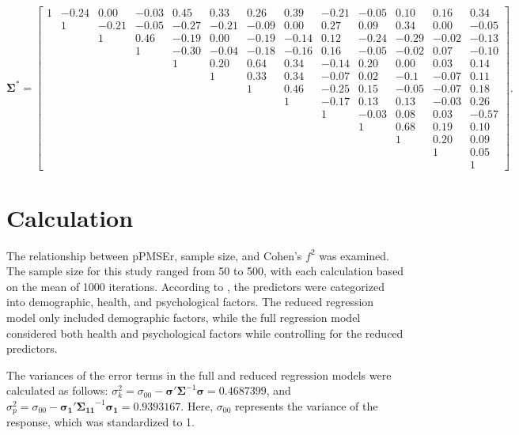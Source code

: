  \scriptsize{
\begin{equation}\label{eq:Sigma}
\bm{\Sigma}^* =
\left[\begin{array}{ccccccccccccc}
  1&   -0.24& 0.00 &-0.03& 0.45 &0.33 &0.26& 0.39 &-0.21& -0.05& 0.10& 0.16 &0.34\\
  &1 &-0.21& -0.05 &-0.27 &-0.21& -0.09& 0.00 &0.27& 0.09 &0.34& 0.00 &-0.05 \\
  & & 1&0.46& -0.19& 0.00& -0.19 &-0.14 &0.12& -0.24 &-0.29& -0.02& -0.13\\
  & & & 1&-0.30& -0.04 &-0.18& -0.16& 0.16 &-0.05& -0.02& 0.07& -0.10 \\
  & & & & 1&0.20& 0.64 &0.34 &-0.14& 0.20& 0.00 &0.03& 0.14 \\
  & & & & & 1&0.33 &0.34& -0.07 &0.02& -0.1& -0.07& 0.11\\
  & & & & & & 1& 0.46& -0.25 &0.15& -0.05 &-0.07 &0.18\\
  & & & & & & & 1&-0.17& 0.13& 0.13 &-0.03& 0.26\\
  & & & & & & & & 1& -0.03 &0.08 &0.03 &-0.57\\
  & & & & & & & & & 1&0.68 &0.19& 0.10\\
  & & & & & & & & & & 1&0.20 &0.09\\
  & & & & & & & & & & & 1& 0.05\\
 & & & & & & & & & & & &1
 \end{array}\right].
 \end{equation}
 }
 \normalsize


\section{Calculation}

The relationship between pPMSEr, sample size, and Cohen's $f^2$ was examined. The sample size for this study ranged from 50 to 500, with each calculation based on the mean of 1000 iterations. According to \cite{baker2008chronicpain}, the predictors were categorized into demographic, health, and psychological factors. The reduced regression model only included demographic factors, while the full regression model considered both health and psychological factors while controlling for the reduced predictors.
  
 The variances of the error terms in the full and reduced regression models were calculated as follows: $\sigma^2_k = \sigma_{00} - \boldsymbol{\sigma}' \boldsymbol{\Sigma}^{-1} \boldsymbol{\sigma} = 0.4687399$, and $\sigma^2_p = \sigma_{00} - \boldsymbol{\sigma_1}' \boldsymbol{\Sigma_{11}}^{-1} \boldsymbol{\sigma_1} = 0.9393167$. Here, $\sigma_{00}$ represents the variance of the response, which was standardized to 1.



